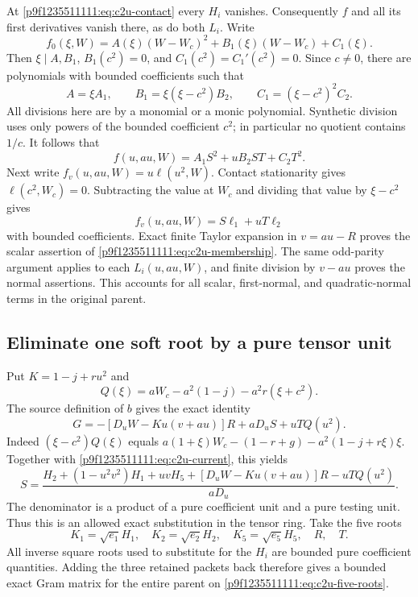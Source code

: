 At \eqref{p9f1235511111:eq:c2u-contact} every $H_i$ vanishes. Consequently $f$ and
all its first derivatives vanish there, as do both $L_i$. Write
\[
 f_0(\xi,W)=A(\xi)(W-W_c)^2+B_1(\xi)(W-W_c)+C_1(\xi).
\]
Then $\xi\mid A,B_1$, $B_1(c^2)=0$, and
$C_1(c^2)=C_1'(c^2)=0$. Since $c\ne0$, there are polynomials with
bounded coefficients such that
\[
 A=\xi A_1,\qquad B_1=\xi(\xi-c^2)B_2,\qquad
 C_1=(\xi-c^2)^2C_2.
\]
All divisions here are by a monomial or a monic polynomial.
Synthetic division uses only powers of the bounded coefficient $c^2$;
in particular no quotient contains $1/c$. It follows that
\[
 f(u,au,W)=A_1S^2+uB_2ST+C_2T^2.
\]
Next write $f_v(u,au,W)=u\ell(u^2,W)$. Contact stationarity gives
$\ell(c^2,W_c)=0$. Subtracting the value at $W_c$ and dividing that
value by $\xi-c^2$ gives
\[
 f_v(u,au,W)=S\ell_1+uT\ell_2
\]
with bounded coefficients. Exact finite Taylor expansion in $v=au-R$
proves the scalar assertion of \eqref{p9f1235511111:eq:c2u-membership}. The same
odd-parity argument applies to each $L_i(u,au,W)$, and finite division
by $v-au$ proves the normal assertions. This accounts for all scalar,
first-normal, and quadratic-normal terms in the original parent.

\subsection{Eliminate one soft root by a pure tensor unit}
Put $K=1-j+ru^2$ and
\[
Q(\xi)=aW_c-a^2(1-j)-a^2r(\xi+c^2).
\]
The source definition of $b$ gives the exact identity
\begin{equation}
G=-[D_uW-Ku(v+au)]R+aD_uS+uTQ(u^2).
\label{p9f1235511111:eq:c2u-current-soft}
\end{equation}
Indeed $(\xi-c^2)Q(\xi)$ equals
$a(1+\xi)W_c-(1-r+g)-a^2(1-j+r\xi)\xi$.
Together with \eqref{p9f1235511111:eq:c2u-current}, this yields
\begin{equation}
S=\frac{H_2+(1-u^2v^2)H_1+uvH_5
 +[D_uW-Ku(v+au)]R-uTQ(u^2)}{aD_u}.
\label{p9f1235511111:eq:c2u-eliminate-S}
\end{equation}
The denominator is a product of a pure coefficient unit and a pure
testing unit.  Thus this is an allowed exact substitution in the tensor
ring.  Take the five roots
\begin{equation}
K_1=\sqrt{e_1}H_1,\quad K_2=\sqrt{e_2}H_2,\quad
K_5=\sqrt{e_5}H_5,\quad R,\quad T.
\label{p9f1235511111:eq:c2u-five-roots}
\end{equation}
All inverse square roots used to substitute for the $H_i$ are bounded
pure coefficient quantities.  Adding the three retained packets back
therefore gives a bounded exact Gram matrix for the entire parent on
\eqref{p9f1235511111:eq:c2u-five-roots}.

